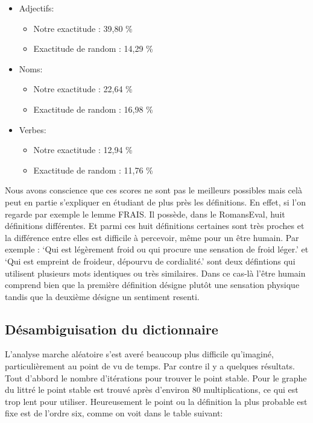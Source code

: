 \begin{itemize}
 \item {Adjectifs:
	\begin{itemize}
	 \item Notre exactitude : 39,80 \%
	 \item Exactitude de random : 14,29 \%
	\end{itemize}
	}
 \item {Noms:
 	\begin{itemize}
	 \item Notre exactitude : 22,64 \%
	 \item Exactitude de random : 16,98 \%
	\end{itemize}
	}
 \item {Verbes:
 	\begin{itemize}
	 \item Notre exactitude : 12,94 \%
	 \item Exactitude de random : 11,76 \%
	\end{itemize}
	}
\end{itemize}

Nous avons conscience que ces scores ne sont pas le meilleurs possibles mais 
celà peut en partie s'expliquer en étudiant de plus près les définitions. En 
effet, si l'on regarde par exemple le lemme FRAIS. Il possède, dans le 
RomansEval, huit définitions différentes. Et parmi ces huit définitions 
certaines sont très proches et la différence entre elles est difficile à 
percevoir, même pour un être humain. Par exemple : `Qui est légèrement froid ou 
qui procure une sensation de froid léger.' et `Qui est empreint de froideur, 
dépourvu de cordialité.' sont deux défintions qui utilisent plusieurs mots 
identiques ou très similaires. Dans ce cas-là l'être humain comprend bien que la 
première définition désigne plutôt une sensation physique tandis que la deuxième 
désigne un sentiment resenti.


\subsection{Désambiguisation du dictionnaire}

L'analyse marche aléatoire s'est averé beaucoup plus difficile qu'imaginé,
particulièrement au point de vu de temps. Par contre il y a quelques
résultats. Tout d'abbord le nombre d'itérations pour trouver le
point stable. Pour le graphe du littré le point stable est trouvé
après d'environ 80 multiplications, ce qui est trop lent pour utiliser.
Heureusement le point ou la définition la plus probable est fixe est
de l'ordre six, comme on voit dans le table suivant:

